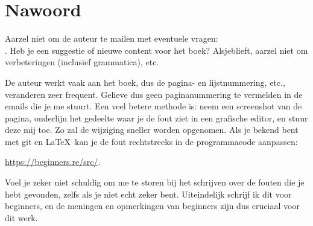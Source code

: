 \part*{Nawoord}

\mysection{\NLph{}}

Aarzel niet om de auteur te mailen met eventuele vragen: \\
\GTT{\EMAILS}.
Heb je een suggestie of nieuwe content voor het boek?
Alsjeblieft, aarzel niet om verbeteringen (inclusief grammatica), etc.

De auteur werkt vaak aan het boek, dus de pagina- en lijstnummering, etc., veranderen zeer frequent.
Gelieve dus geen paginanummering te vermelden in de emails die je me stuurt.
Een veel betere methode is: neem een screenshot van de pagina, onderlijn het gedeelte waar je de fout ziet in een grafische editor,
en stuur deze mij toe. Zo zal de wijziging sneller worden opgenomen.
Als je bekend bent met git en \LaTeX\, kan je de fout rechtstreeks in de programmacode aanpassen:

\url{https://beginners.re/src/}.

Voel je zeker niet schuldig om me te storen bij het schrijven over de fouten die je hebt gevonden, zelfs als je niet echt zeker bent.
Uiteindelijk schrijf ik dit voor beginners, en de meningen en opmerkingen van beginners zijn dus cruciaal voor dit werk.

